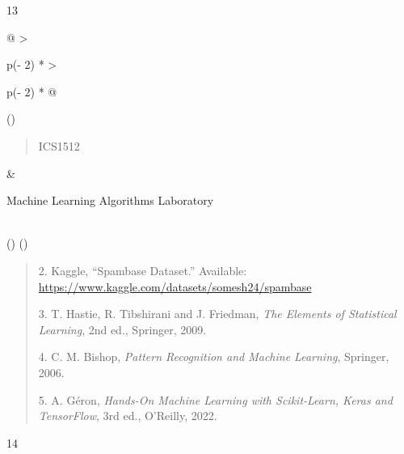 \documentclass[
]{article}
\begin{document}
13

\begin{longtable}[]{@{}
  >{\raggedright\arraybackslash}p{(\columnwidth - 2\tabcolsep) * }
  >{\raggedright\arraybackslash}p{(\columnwidth - 2\tabcolsep) * }@{}}
\toprule()
\begin{minipage}[b]{\linewidth}\raggedright
\begin{quote}
ICS1512
\end{quote}
\end{minipage} & \begin{minipage}[b]{\linewidth}\raggedright
Machine Learning Algorithms Laboratory
\end{minipage} \\
\midrule()
\endhead
\bottomrule()
\end{longtable}

\begin{quote}
2. Kaggle, ``Spambase Dataset.'' Available:
\url{https://www.kaggle.com/datasets/somesh24/spambase}

3. T. Hastie, R. Tibshirani and J. Friedman, \emph{The Elements of
Statistical Learning}, 2nd ed., Springer, 2009.

4. C. M. Bishop, \emph{Pattern Recognition and Machine Learning},
Springer, 2006.

5. A. Géron, \emph{Hands-On Machine Learning with Scikit-Learn, Keras
and TensorFlow}, 3rd ed., O'Reilly, 2022.
\end{quote}

14
\end{document}
